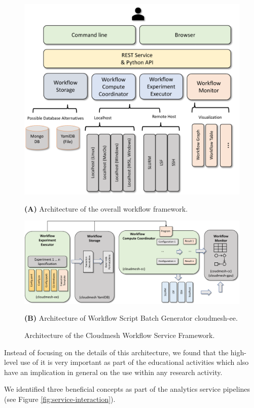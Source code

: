 \documentclass[utf8]{FrontiersinVancouver} %
\begin{document}
\begin{figure}[htb]
    \centering\includegraphics[width=0.70\columnwidth]{images/cloudmesh-cc-new}
    
    {\bf (A)} Architecture of the overall workflow framework.

\bigskip\bigskip
    
    \centering\includegraphics[width=1.0\columnwidth]{images/cloudmesh-sbatch-new}
    
    
    {\bf (B)} Architecture of Workflow Script Batch Generator cloudmesh-ee.

    \caption{Architecture of the Cloudmesh Workflow Service Framework.}
    \label{fig:cc-2}

\end{figure}

Instead of focusing on the details of this architecture, we found that the high-level use of it is very important as part of the educational activities which also have an implication in general on the use within any research activity.

We identified three beneficial concepts as part of the analytics service pipelines (see Figure \ref{fig:service-interaction}).
\end{document}
